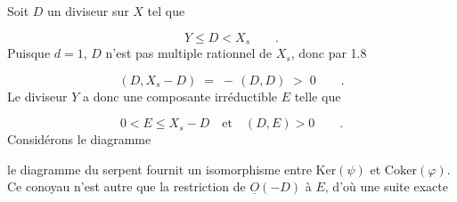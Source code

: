 Soit $D$ un diviseur sur $X$ tel que

\begin{equation*}
Y \leq D < X_s \qquad .
\end{equation*}
Puisque $d = 1$, $D$ n'est pas multiple rationnel de $X_s$, donc par 1.8

\begin{equation*}
(D,X_s-D) \;=\; - \,(D,D) \;>\; 0 \qquad .
\end{equation*}
Le diviseur $Y$ a donc une composante irréductible $E$ telle que

\begin{equation*}
0 < E \leq X_s-D \quad \text{et} \quad (D,E) > 0 \qquad .
\end{equation*}
Considérons le diagramme

\begin{center}
\end{center}
le diagramme du serpent fournit un isomorphisme entre $\mathrm{Ker}(\psi)$ et $\mathrm{Coker}(\varphi)$. Ce conoyau n'est autre que la restriction de $\underline{O}(-D)$ à $E$, d'où une suite exacte

